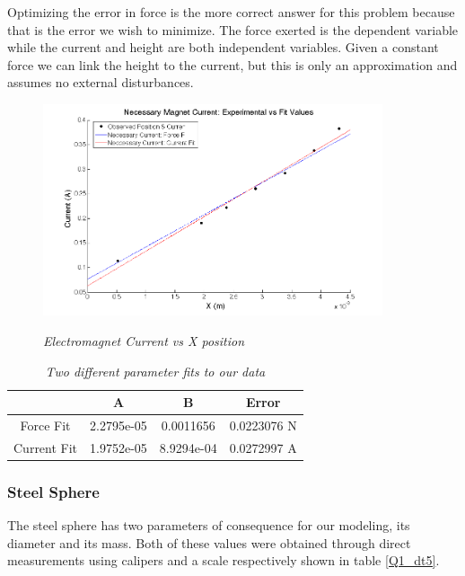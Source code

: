 \documentclass{article}
\theoremstyle{plain}
\theoremstyle{definition}
\theoremstyle{remark}
\begin{document}
Optimizing the error in force is the more correct answer for this problem because that is the error we wish to minimize. The force exerted is the dependent variable while the current and height are both independent variables.  Given a constant force we can link the height to the current, but this is only an approximation and assumes no external disturbances.  

\begin{figure}
\begin{center}
\includegraphics[width = 10cm]{magnetDataFits.png}
\label{Q1_d3}
\caption{\emph{Electromagnet Current vs X position}}
\end{center}
\end{figure}

\begin{table}
\begin{center}
    \begin{tabular}{|c|c|c|c|}
        \hline
        ~           & A          & B         &  Error \\ \hline
        Force Fit   & 2.2795e-05 & 0.0011656  & 0.0223076 N \\ 
        Current Fit & 1.9752e-05 & 8.9294e-04 & 0.0272997 A\\
        \hline
    \end{tabular}
\caption{\emph{Two different parameter fits to our data}}
\label{Q1_dt4}
\end{center}
\end{table}

\subsubsection*{Steel Sphere}
The steel sphere has two parameters of consequence for our modeling, its diameter and its mass.  Both of these values were obtained through direct measurements using calipers and a scale respectively shown in table \ref{Q1_dt5}.
\end{document}
